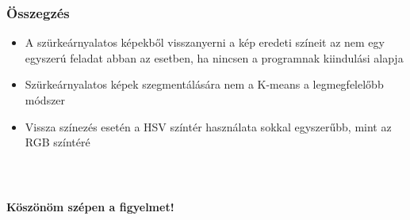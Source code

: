 \documentclass{beamer}
\begin{document}
\begin{frame}[fragile]
\frametitle{Összegzés}
\begin{itemize}
	\item A szürkeárnyalatos képekből visszanyerni a kép eredeti színeit az nem egy egyszerú feladat abban az esetben, ha nincsen a programnak kiindulási alapja
    \item Szürkeárnyalatos képek szegmentálására nem a K-means a legmegfelelőbb módszer
    \item Vissza színezés esetén a HSV színtér használata sokkal egyszerűbb, mint az RGB színtéré
\end{itemize}

\end{frame}

\begin{frame}[fragile]
\frametitle{\ }

\begin{center}

    \Large

    \textbf{Köszönöm szépen a figyelmet!}

    \bigskip

\end{center}

\end{frame}
\end{document}
